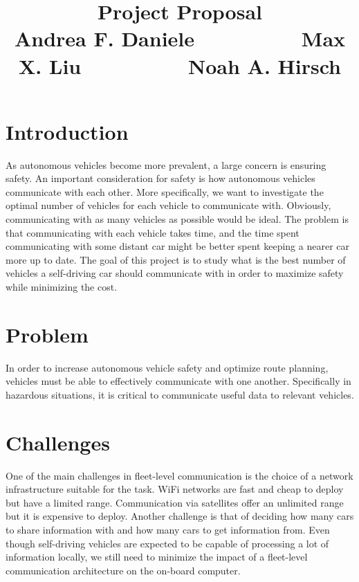 \documentclass{article}
\title{Project Proposal\vspace{-6pt}\\{\large Andrea F. Daniele $\hspace{2cm}$ Max X. Liu $\hspace{2cm}$ Noah A. Hirsch }}
\begin{document}
\maketitle


\vspace{-1.2cm}

\section*{Introduction}
\vspace{-.3cm}
As autonomous vehicles become more prevalent, a large concern is ensuring safety. 
An important consideration for safety is how autonomous vehicles communicate with each other. 
More specifically, we want to investigate the optimal number of vehicles for each vehicle to communicate with. 
Obviously, communicating with as many vehicles as possible would be ideal. 
The problem is that communicating with each vehicle takes time, and the time spent communicating 
with some distant car might be better spent keeping a nearer car more up to date. 
The goal of this project is to study what is the best number of vehicles a self-driving car should 
communicate with in order to maximize safety while minimizing the cost.

\section*{Problem}
\vspace{-.3cm}
In order to increase autonomous vehicle safety and optimize route planning, vehicles must be able to effectively communicate with one another. Specifically in hazardous situations, it is critical to communicate useful data to relevant vehicles.

\section*{Challenges}
\vspace{-.3cm}
One of the main challenges in fleet-level communication is the choice of a network infrastructure suitable
for the task. WiFi networks are fast and cheap to deploy but have a limited range. Communication via satellites
offer an unlimited range but it is expensive to deploy. Another challenge is that of deciding how many cars
to share information with and how many cars to get information from. Even though self-driving vehicles are
expected to be capable of processing a lot of information locally, we still need to minimize the impact of a 
fleet-level communication architecture on the on-board computer.
\end{document}
